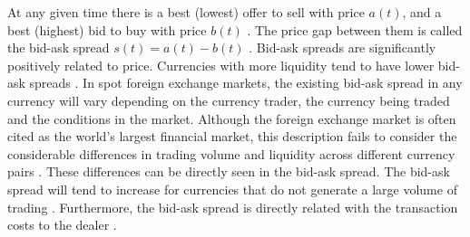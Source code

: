 At any given time there is a best (lowest) offer to sell with price
$a\left(t\right)$, and a best (highest) bid to buy with price $b\left(t\right)$
\cite{subtle_nature,book_forex,prop_order_book,account_spread,limit_ord_spread,stat_theory}.
The price gap between them is called the bid-ask spread
$s\left(t\right) = a\left(t\right)-b\left(t\right)$
\cite{teach_spread,subtle_nature,Bouchaud_2004,book_forex,account_spread,stat_theory,large_prices_changes,market_digest,em_stylized_facts}.
Bid-ask spreads are significantly positively related to price. Currencies with
more liquidity tend to have lower bid-ask spreads
\cite{components_spread_tokyo,account_spread,effects_spread,components_spread}.
In spot foreign exchange markets, the existing bid-ask spread in any currency
will vary depending on the currency trader, the currency being traded and the
conditions in the market. Although the foreign exchange market is often cited
as the world's largest financial market, this description fails to consider the
considerable differences in trading volume and liquidity across different
currency pairs \cite{forex_microstructure,book_forex_2}. These differences can
be directly seen in the bid-ask spread. The bid-ask spread will tend to
increase for currencies that do not generate a large volume of trading
\cite{book_forex_2}. Furthermore, the bid-ask spread is directly related with
the transaction costs to the dealer
\cite{teach_spread,spread_futures,book_forex_2}.

